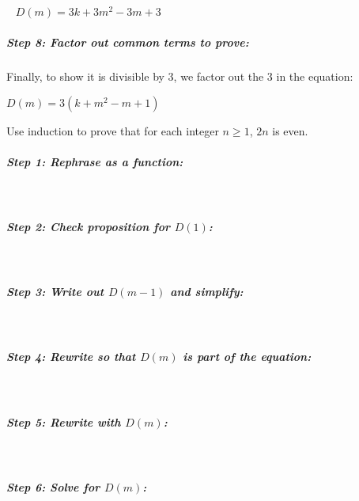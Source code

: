 \documentclass[a4paper,12pt]{book}
\newcounter{question}
\begin{document}
\begin{intro}{\ }
                $D(m) = 3k + 3m^{2} - 3m + 3$

            \subparagraph{Step 8: Factor out common terms to prove:}
                Finally, to show it is divisible by 3, we factor out
                the 3 in the equation:

                $D(m) = 3(k + m^{2} - m + 1)$
        \end{intro}

        \newpage
        
        \begin{questionNOGRADE}{\thequestion}
            Use induction to prove that for each integer $n \geq 1$, $2n$ is even.

            \subparagraph{Step 1: Rephrase as a function:} ~\\
            
            \subparagraph{Step 2: Check proposition for $D(1)$:} ~\\

            \subparagraph{Step 3: Write out $D(m-1)$ and simplify:} ~\\

            \subparagraph{Step 4: Rewrite so that $D(m)$ is part of the equation:} ~\\

            \subparagraph{Step 5: Rewrite with $D(m)$:}~\\

            \subparagraph{Step 6: Solve for $D(m)$:}~\\


\end{questionNOGRADE}
\end{document}
